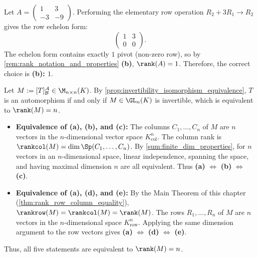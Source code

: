 \begin{exercisesolution*}
\label{sol:rank_2x2_matrix_sc}
Let $A = \left(\begin{smallmatrix} 1 & 3 \\ -3 & -9 \end{smallmatrix}\right)$.
Performing the elementary row operation $R_2 + 3R_1 \to R_2$ gives the row echelon form:
\[
\begin{pmatrix} 1 & 3 \\ 0 & 0 \end{pmatrix}.
\]
The echelon form contains exactly $1$ pivot (non-zero row), so by \cref{rem:rank_notation_and_properties} \textbf{(b)}, $\rank(A) = 1$.
Therefore, the correct choice is \textbf{(b): $1$}.
\end{exercisesolution*}

\begin{exercisesolution}
\label{sol:invertibility_characterizations_rep_matrix}
Let $M := [T]_{\mathcal{B}}^{\mathcal{A}} \in \M_{n \times n}(K)$.
By \cref{prop:invertibility_isomorphism_equivalence}, $T$ is an automorphism if and only if $M \in \GL_n(K)$ is invertible, which is equivalent to $\rank(M) = n$.

\begin{itemize}
    \item \textbf{Equivalence of (a), (b), and (c):}
    The columns $C_1, \dots, C_n$ of $M$ are $n$ vectors in the $n$-dimensional vector space $K_{\mathrm{col}}^n$.
    The column rank is $\rankcol(M) = \dim \Sp(C_1, \dots, C_n)$.
    By \cref{sum:finite_dim_properties}, for $n$ vectors in an $n$-dimensional space, linear independence, spanning the space, and having maximal dimension $n$ are all equivalent.
    Thus \textbf{(a)} $\iff$ \textbf{(b)} $\iff$ \textbf{(c)}.

    \item \textbf{Equivalence of (a), (d), and (e):}
    By the Main Theorem of this chapter (\cref{thm:rank_row_column_equality}), $\rankrow(M) = \rankcol(M) = \rank(M)$.
    The rows $R_1, \dots, R_n$ of $M$ are $n$ vectors in the $n$-dimensional space $K_{\mathrm{row}}^n$.
    Applying the same dimension argument to the row vectors gives \textbf{(a)} $\iff$ \textbf{(d)} $\iff$ \textbf{(e)}.
\end{itemize}
Thus, all five statements are equivalent to $\rank(M) = n$.
\end{exercisesolution}

